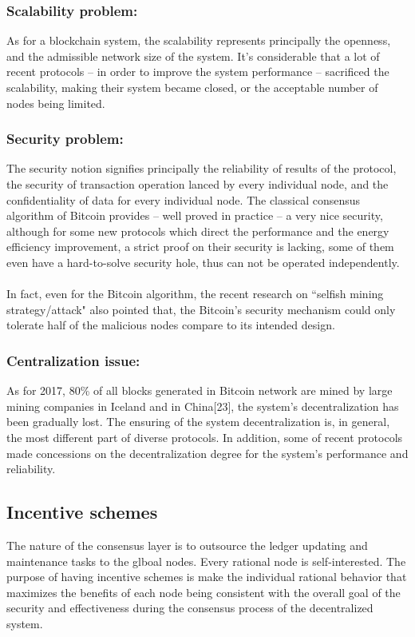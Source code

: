 \documentclass[]{article}
\begin{document}
\begin{CJK*}{UTF8}{gbsn}
\subsubsection*{Scalability problem:}	  As for a blockchain system, the scalability represents principally the openness, and the admissible network size of the system. It’s considerable that a lot of recent protocols – in order to improve the system performance – sacrificed the scalability, making their system became closed, or the acceptable number of nodes being limited. 
\subsubsection*{Security problem:} The security notion signifies principally the reliability of results of the protocol, the security of transaction operation lanced by every individual node, and the confidentiality of data for every individual node. The classical consensus algorithm of Bitcoin provides – well proved in practice – a very nice security, although for some new protocols which direct the performance and the energy efficiency improvement, a strict proof on their security is lacking, some of them even have a hard-to-solve security hole, thus can not be operated independently.
\paragraph{}
	In fact, even for the Bitcoin algorithm, the recent research on ``selfish mining strategy/attack" also pointed that, the Bitcoin’s security mechanism could only tolerate half of 
the malicious nodes compare to its intended design.
\subsubsection*{Centralization issue:}
 As for 2017, 80\% of all blocks generated in Bitcoin network are mined by large mining companies in Iceland and in China[23], the system’s decentralization has been gradually lost. The ensuring of the system decentralization is, in general, the most different part of diverse protocols. In addition, some of recent protocols made concessions on the decentralization degree for the system’s performance and reliability.
\subsection{Incentive schemes}
The nature of the consensus layer is to outsource the ledger updating and maintenance tasks to the glboal nodes. Every rational node is self-interested. The purpose of having incentive schemes is make the individual rational behavior that maximizes the benefits of each node being consistent with the overall goal of the security and effectiveness during the consensus process of the decentralized system.

\end{CJK*}
\end{document}
